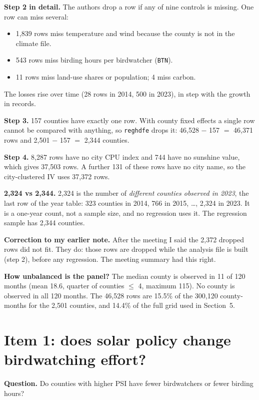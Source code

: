 \documentclass[11pt]{article}
\begin{document}
\textbf{Step 2 in detail.} The authors drop a row if any of nine controls is missing. One row can miss several:
\begin{itemize}[leftmargin=14pt,itemsep=1pt]
\item 1,839 rows miss temperature and wind because the county is not in the climate file.
\item 543 rows miss birding hours per birdwatcher (\texttt{BTN}).
\item 11 rows miss land-use shares or population; 4 miss carbon.
\end{itemize}
The losses rise over time (28 rows in 2014, 500 in 2023), in step with the growth in records.

\textbf{Step 3.} 157 counties have exactly one row. With county fixed effects a single row cannot be compared with anything, so \texttt{reghdfe} drops it: 46,528 $-$ 157 $=$ 46,371 rows and 2,501 $-$ 157 $=$ 2,344 counties.

\textbf{Step 4.} 8,287 rows have no city CPU index and 744 have no sunshine value, which gives 37,503 rows. A further 131 of these rows have no city name, so the city-clustered IV uses 37,372 rows.

\begin{answerbox}
\textbf{2,324 vs 2,344.} 2,324 is the number of \emph{different counties observed in 2023}, the last row of the year table: 323 counties in 2014, 766 in 2015, \ldots, 2,324 in 2023. It is a one-year count, not a sample size, and no regression uses it. The regression sample has 2,344 counties.

\textbf{Correction to my earlier note.} After the meeting I said the 2,372 dropped rows did not fit. They do: those rows are dropped while the analysis file is built (step 2), before any regression. The meeting summary had this right.
\end{answerbox}

\textbf{How unbalanced is the panel?} The median county is observed in 11 of 120 months (mean 18.6, quarter of counties $\le$ 4, maximum 115). No county is observed in all 120 months. The 46,528 rows are 15.5\% of the 300,120 county-months for the 2,501 counties, and 14.4\% of the full grid used in Section~5.

\section{Item 1: does solar policy change birdwatching effort?}
\textbf{Question.} Do counties with higher PSI have fewer birdwatchers or fewer birding hours?
\end{document}
